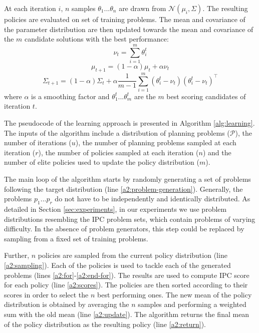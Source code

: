 \documentclass[letterpaper]{article} %
\begin{document}
At each iteration $i$, $n$ samples $\theta_1$...$\theta_n$ are drawn from $\mathcal{N}(\mu_i, \Sigma)$. The resulting policies are evaluated on set of training problems. The mean and covariance of the parameter distribution are then updated towards the mean and covariance of the $m$ candidate solutions with the best performance:
\begin{equation}
\nu_t = \displaystyle\sum_{i=1}^{m}\theta_i^{t}
\end{equation}
\begin{equation}
\mu_{t+1} = (1-\alpha)\mu_t + \alpha\nu_t
\label{eq:mu}
\end{equation}
\begin{equation}
\Sigma_{t+1} = (1-\alpha)\Sigma_t + \alpha\frac{1}{m-1}\displaystyle\sum_{i=1}^{m}(\theta_i^{t}-\nu_{t})(\theta_i^{t}-\nu_{t})^\top
\label{eq:sigma}
\end{equation}
where $\alpha$ is a smoothing factor and $\theta_1^{t}$...$\theta_m^{t}$ are the $m$ best scoring candidates of iteration $t$.

The pseudocode of the learning approach is presented in Algorithm \ref{alg:learning}. The inputs of the algorithm include a distribution of planning problems ($\mathcal{P}$), the number of iterations ($u$), the number of planning problems sampled at each iteration ($r$), the number of policies sampled at each iteration ($n$) and the number of elite policies used to update the policy distribution ($m$).

The main loop of the algorithm starts by randomly generating a set of problems following the target distribution (line \ref{a2:problem-generation}). Generally, the problems $p_1$...$p_r$ do not have to be independently and identically distributed. As detailed in Section \ref{sec:experiments}, in our experiments we use problem distributions resembling the IPC problem sets, which contain problems of varying difficulty. In the absence of problem generators, this step could be replaced by sampling from a fixed set of training problems.

Further, $n$ policies are sampled from the current policy distribution (line \ref{a2:sampling}). Each of the policies is used to tackle each of the generated problems (lines \ref{a2:for}-\ref{a2:end-for}). The results are used to compute IPC score for each policy (line \ref{a2:scores}). The policies are then sorted according to their scores in order to select the $n$ best performing ones. The new mean of the policy distribution is obtained by averaging the $n$ samples and performing a weighted sum with the old mean (line \ref{a2:update}). The algorithm returns the final mean of the policy distribution as the resulting policy (line \ref{a2:return}).
\end{document}
